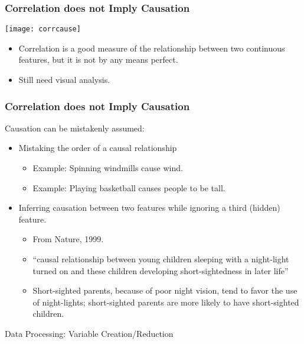 \begin{frame}[fragile] \frametitle{Correlation does not Imply Causation}
\begin{center}
\texttt{[image: corrcause]}
\end{center}
\begin{itemize}
\item Correlation is a good measure of the relationship between two continuous features, but it is not by any means perfect.
\item  Still need visual analysis.
\end{itemize}
\end{frame}



\begin{frame}[fragile]\frametitle{Correlation does not Imply Causation}	
Causation can be mistakenly assumed:

	\begin{itemize}
	\item Mistaking the order of a causal relationship
		\begin{itemize}
		\item Example: Spinning windmills cause wind.
		\item Example: Playing basketball causes people to be tall.
		\end{itemize}
	\item Inferring causation between two features while ignoring a third (hidden) feature.
		\begin{itemize}
		\item From Nature, 1999.
		\item ``causal relationship between young children sleeping with a night-light turned on and these children developing short-sightedness in later life''
		\item Short-sighted parents, because of poor night vision, tend to favor the use of night-lights; short-sighted parents are more likely to have short-sighted children.
		\end{itemize}
	\end{itemize}

\end{frame}





\begin{frame}
  \begin{center}
    {\Large Data Processing: Variable Creation/Reduction}
  \end{center}
\end{frame}


